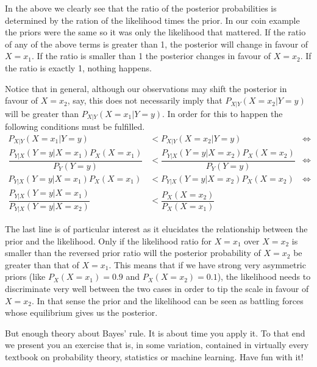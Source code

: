 \documentclass[a4paper,11pt,leqno]{report}
\begin{document}
In the above we clearly see that the ratio of the posterior probabilities is determined by the ration of the likelihood times the
prior. In our coin example the priors were the same so it was only the likelihood that mattered. If the ratio of any of the above
terms is greater than 1, the posterior will change in favour of $ X=x_{1} $. If the ratio is smaller than 1 the posterior changes
in favour of $ X=x_{2} $. If the ratio is exactly 1, nothing happens. 

Notice that in general, although our observations may shift the posterior in favour of $ X=x_{2} $, say, this does not necessarily imply that 
$ P_{X|Y}(X=x_{2}|Y=y) $ will be greater than $ P_{X|Y}(X=x_{1}|Y=y) $. In order for this to happen the following conditions
must be fulfilled.
\begin{align}
P_{X|Y}(X=x_{1}|Y=y) &< P_{X|Y}(X=x_{2}|Y=y)  &\Leftrightarrow \\
\dfrac{P_{Y|X}(Y=y|X=x_{1})P_{X}(X=x_{1})}{P_{Y}(Y=y)} &< \dfrac{P_{Y|X}(Y=y|X=x_{2})P_{X}(X=x_{2})}{P_{Y}(Y=y)} &\Leftrightarrow \\
P_{Y|X}(Y=y|X=x_{1})P_{X}(X=x_{1}) &< P_{Y|X}(Y=y|X=x_{2})P_{X}(X=x_{2}) &\Leftrightarrow \\
\dfrac{P_{Y|X}(Y=y|X=x_{1})}{P_{Y|X}(Y=y|X=x_{2})} &< \dfrac{P_{X}(X=x_{2})}{P_{X}(X=x_{1})}
\end{align} 

The last line is of particular interest as it elucidates the relationship between the prior and the likelihood. Only if the likelihood
ratio for $ X=x_{1} $ over $ X=x_{2} $ is smaller than the reversed prior ratio will the posterior probability of $ X=x_{2} $
be greater than that of $ X=x_{1} $. This means that if we have strong very asymmetric priors (like $ P_{X}(X=x_{1}) = 0.9 $
and $ P_{X}(X=x_{2}) = 0.1 $), the likelihood needs to discriminate very well between the two cases in order to tip the scale in
favour of $ X=x_{2} $. In that sense the prior and the likelihood can be seen as battling forces whose equilibrium gives us 
the posterior.

But enough theory about Bayes' rule. It is about time you apply it. To that end we present you an exercise that is, in some variation,
contained in virtually every textbook on probability theory, statistics or machine learning. Have fun with it!
\end{document}
